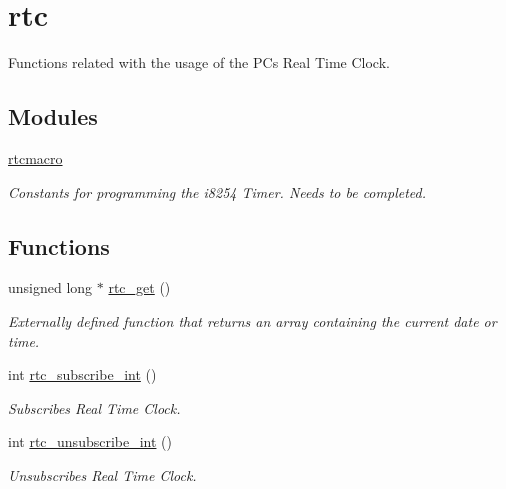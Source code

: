 \hypertarget{group__rtc}{}\section{rtc}
\label{group__rtc}


Functions related with the usage of the PC\textquotesingle{}s Real Time Clock.  


\subsection*{Modules}
\begin{DoxyCompactItemize}
\item 
\hyperlink{group__rtcmacro}{rtcmacro}
\begin{DoxyCompactList}\small\item\em Constants for programming the i8254 Timer. Needs to be completed. \end{DoxyCompactList}\end{DoxyCompactItemize}
\subsection*{Functions}
\begin{DoxyCompactItemize}
\item 
unsigned long $\ast$ \hyperlink{group__rtc_ga4ca5626e3ae7e8da1ad9183a7e6aa999}{rtc\+\_\+get} ()
\begin{DoxyCompactList}\small\item\em Externally defined function that returns an array containing the current date or time. \end{DoxyCompactList}\item 
int \hyperlink{group__rtc_gabd8de825e876e8ef94c64ac616f68a11}{rtc\+\_\+subscribe\+\_\+int} ()
\begin{DoxyCompactList}\small\item\em Subscribes Real Time Clock. \end{DoxyCompactList}\item 
int \hyperlink{group__rtc_gab8f17bf5280c908c8b199a90fefcc758}{rtc\+\_\+unsubscribe\+\_\+int} ()
\begin{DoxyCompactList}\small\item\em Unsubscribes Real Time Clock. \end{DoxyCompactList}\end{DoxyCompactItemize}
